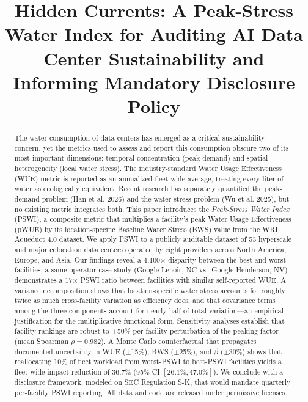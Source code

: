 \documentclass[conference,10pt]{IEEEtran}
\begin{document}
\title{Hidden Currents: A Peak-Stress Water Index for Auditing AI Data Center Sustainability and Informing Mandatory Disclosure Policy}

\author{
}

\maketitle

\begin{abstract}
The water consumption of data centers has emerged as a critical
sustainability concern, yet the metrics used to assess and report this
consumption obscure two of its most important dimensions: temporal
concentration (peak demand) and spatial heterogeneity (local water stress).
The industry-standard Water Usage Effectiveness (WUE) metric is reported as
an annualized fleet-wide average, treating every liter of water as
ecologically equivalent. Recent research has separately quantified the
peak-demand problem (Han et al. 2026) and the water-stress problem (Wu et
al. 2025), but no existing metric integrates both. This paper introduces
the \emph{Peak-Stress Water Index} (PSWI), a composite metric that
multiplies a facility's peak Water Usage Effectiveness (pWUE) by its
location-specific Baseline Water Stress (BWS) value from the WRI Aqueduct
4.0 dataset. We apply PSWI to a publicly auditable dataset of 53 hyperscale
and major colocation data centers operated by eight providers across North
America, Europe, and Asia. Our findings reveal a 4{,}100$\times$ disparity
between the best and worst facilities; a same-operator case study (Google
Lenoir, NC vs.\ Google Henderson, NV) demonstrates a 17$\times$ PSWI ratio
between facilities with similar self-reported WUE. A variance decomposition
shows that location-specific water stress accounts for roughly twice as
much cross-facility variation as efficiency does, and that covariance
terms among the three components account for nearly half of total
variation---an empirical justification for the multiplicative functional
form. Sensitivity analyses establish that facility rankings are robust to
$\pm$50\% per-facility perturbation of the peaking factor (mean Spearman
$\rho = 0.982$). A Monte Carlo counterfactual that propagates documented
uncertainty in WUE ($\pm$15\%), BWS ($\pm$25\%), and $\beta$ ($\pm$30\%)
shows that reallocating 10\% of fleet workload from worst-PSWI to
best-PSWI facilities yields a fleet-wide impact reduction of 36.7\% (95\%
CI $[26.1\%, 47.0\%]$). We conclude with a disclosure framework, modeled
on SEC Regulation S-K, that would mandate quarterly per-facility PSWI
reporting. All data and code are released under permissive licenses.
\end{abstract}
\end{document}
